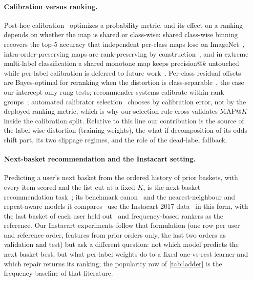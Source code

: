 \documentclass[sigconf,nonacm]{acmart}
\makeatletter
\newcommand{\mapk}{\mathrm{MAP}@K\xspace}
\makeatother
\begin{document}
\paragraph{Calibration versus ranking.} Post-hoc calibration~\cite{Platt1999,Zadrozny2002,NiculescuMizil2005,Kull2017Beta,Guo2017Calibration} optimizes a probability metric, and its effect on a ranking depends on whether the map is shared or class-wise: shared class-wise binning recovers the top-5 accuracy that independent per-class maps lose on ImageNet~\cite{Patel2021IMax}, intra-order-preserving maps are rank-preserving by construction~\cite{Rahimi2020IntraOrder}, and in extreme multi-label classification a shared monotone map keeps precision@$k$ untouched while per-label calibration is deferred to future work~\cite{Ullah2025XMLCCalib}. Per-class residual offsets are Bayes-optimal for reranking when the distortion is class-separable~\cite{Wang2026BeyondLA}, the case our intercept-only rung tests; recommender systems calibrate within rank groups~\cite{Sato2024TopN}; automated calibrator selection~\cite{Abdelrahman2025SmartCal} chooses by calibration error, not by the deployed ranking metric, which is why our selection rule cross-validates $\mapk$ inside the calibration split. Relative to this line our contribution is the source of the label-wise distortion (training weights), the what-if decomposition of its odds-shift part, its two slippage regimes, and the role of the dead-label fallback.

\paragraph{Next-basket recommendation and the Instacart setting.} Predicting a user's next basket from the ordered history of prior baskets, with every item scored and the list cut at a fixed $K$, is the next-basket recommendation task~\cite{Yu2016DREAM}; its benchmark canon~\cite{Li2023NBRRealityCheck} and the nearest-neighbour and repeat-aware models it compares~\cite{Hu2020TIFUKNN,Ariannezhad2022ReCANet} use the Instacart 2017 data~\cite{Instacart2017} in this form, with the last basket of each user held out~\cite{Ariannezhad2022ReCANet} and frequency-based rankers as the reference. Our Instacart experiments follow that formulation (one row per user and reference order, features from prior orders only, the last two orders as validation and test) but ask a different question: not which model predicts the next basket best, but what per-label weights do to a fixed one-vs-rest learner and which repair returns its ranking; the popularity row of \cref{tab:ladder} is the frequency baseline of that literature.
\end{document}
